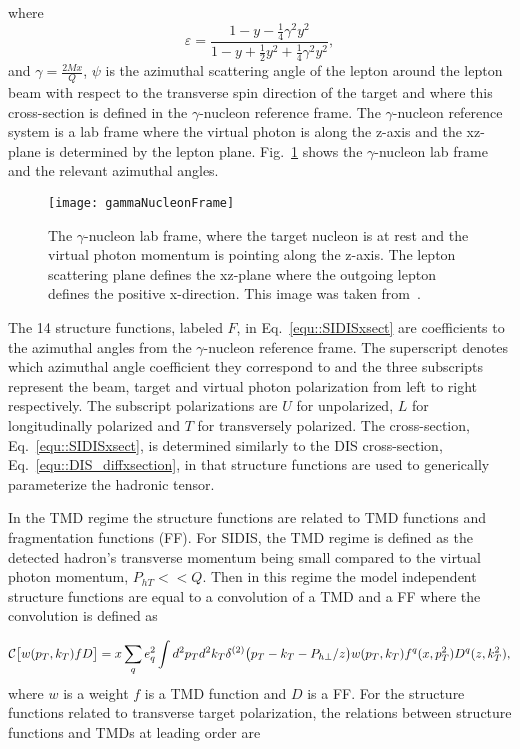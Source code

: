 \noindent
where
\begin{equation}
  \varepsilon =
  \frac{1-y-\frac{1}{4}\gamma^2y^2}{1-y+\frac{1}{2}y^2+\frac{1}{4}\gamma^2y^2},
\end{equation}
\noindent
and $\gamma = \frac{2Mx}{Q}$, $\psi$ is the azimuthal scattering angle of the
lepton around the lepton beam with respect to the transverse spin direction of
the target and where this cross-section is defined in the $\gamma$-nucleon
reference frame.  The $\gamma$-nucleon reference system is a lab frame where
the virtual photon is along the z-axis and the xz-plane is determined by the
lepton plane.  Fig.~\ref{fig::gammaNucleonFrame} shows the $\gamma$-nucleon lab
frame and the relevant azimuthal angles.

\begin{figure}[h!t]
  \centering \texttt{[image: gammaNucleonFrame]}
  \caption{The $\gamma$-nucleon lab frame, where the target nucleon is at rest
    and the virtual photon momentum is pointing along the z-axis.  The lepton
    scattering plane defines the xz-plane where the outgoing lepton defines the
    positive x-direction.  This image was taken from~\cite{Bacchetta:2006tn}.}
  \label{fig::gammaNucleonFrame}
\end{figure}

The 14 structure functions, labeled $F$, in Eq.~\ref{equ::SIDISxsect} are
coefficients to the azimuthal angles from the $\gamma$-nucleon reference frame.
The superscript denotes which azimuthal angle coefficient they correspond to and
the three subscripts represent the beam, target and virtual photon polarization
from left to right respectively.  The subscript polarizations are $U$ for
unpolarized, $L$ for longitudinally polarized and $T$ for transversely
polarized.  The cross-section, Eq.~\ref{equ::SIDISxsect}, is determined
similarly to the DIS cross-section, Eq.~\ref{equ::DIS_diffxsection}, in that
structure functions are used to generically parameterize the hadronic tensor.

In the TMD regime the structure functions are related to TMD functions and
fragmentation functions (FF).  For SIDIS, the TMD regime is defined as the
detected hadron's transverse momentum being small compared to the virtual photon
momentum, $P_{hT} << Q$.  Then in this regime the model independent structure
functions are equal to a convolution of a TMD and a FF where the
convolution is defined as

\begin{equation}
  \label{equ::SIDIS_conv}
{\cal C}\bigl[ w(p_T,k_T) f D \bigr] = x \sum_q e_q^2 \int d^2 p_T d^2 k_T
\delta^{(2)}\bigl(p_T - k_T - P_{h \perp}/z \bigr) w(p_T,k_T)
f^q(x,p_T^2)D^q(z,k_T^2),
\end{equation}
\noindent
where $w$ is a weight $f$ is a TMD function and $D$ is a FF.  For the structure
functions related to transverse target polarization, the relations between
structure functions and TMDs at leading order are~\cite{Bacchetta:2006tn}

